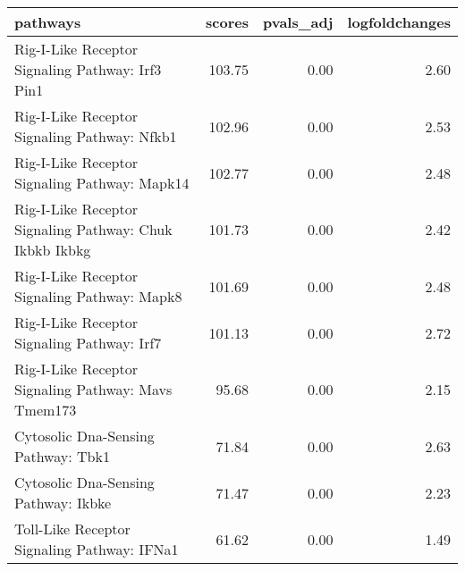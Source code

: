 \begin{tabular}{lrrr}
\toprule
pathways & scores & pvals\_adj & logfoldchanges \\
\midrule
Rig-I-Like Receptor Signaling Pathway: Irf3 Pin1 & 103.75 & 0.00 & 2.60 \\
Rig-I-Like Receptor Signaling Pathway: Nfkb1 & 102.96 & 0.00 & 2.53 \\
Rig-I-Like Receptor Signaling Pathway: Mapk14 & 102.77 & 0.00 & 2.48 \\
Rig-I-Like Receptor Signaling Pathway: Chuk Ikbkb Ikbkg & 101.73 & 0.00 & 2.42 \\
Rig-I-Like Receptor Signaling Pathway: Mapk8 & 101.69 & 0.00 & 2.48 \\
Rig-I-Like Receptor Signaling Pathway: Irf7 & 101.13 & 0.00 & 2.72 \\
Rig-I-Like Receptor Signaling Pathway: Mavs Tmem173 & 95.68 & 0.00 & 2.15 \\
Cytosolic Dna-Sensing Pathway: Tbk1 & 71.84 & 0.00 & 2.63 \\
Cytosolic Dna-Sensing Pathway: Ikbke & 71.47 & 0.00 & 2.23 \\
Toll-Like Receptor Signaling Pathway: IFNa1 & 61.62 & 0.00 & 1.49 \\
\bottomrule
\end{tabular}
